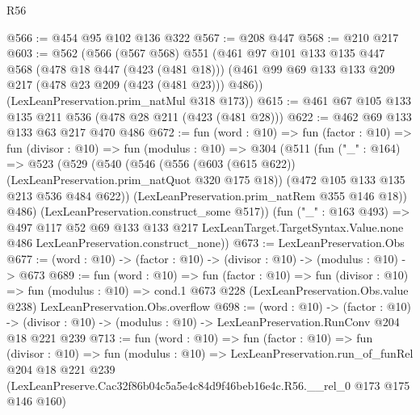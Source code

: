 \begin{lexlean}{R56}
\begin{coremodule}
@566 := @454 @95 @102 @136 @322
@567 := @208 @447
@568 := @210 @217
@603 := @562
    (@566
      (@567 @568)
      @551
      (@461
        @97
        @101
        @133
        @135
        @447
        @568
        (@478 @18 @447 (@423 (@481 @18)))
        (@461 @99 @69 @133 @133 @209 @217 (@478 @23 @209 (@423 (@481 @23))) @486))
      (LexLeanPreservation.prim_natMul @318 @173))
@615 := @461 @67 @105 @133 @135 @211 @536 (@478 @28 @211 (@423 (@481 @28)))
@622 := @462 @69 @133 @133 @63 @217 @470 @486
@672 := fun (word : @10) =>
  fun (factor : @10) =>
  fun (divisor : @10) =>
  fun (modulus : @10) =>
  @304
    (@511
      (fun ("_" : @164) =>
      @523
        (@529
          (@540
            (@546
              (@556 (@603 (@615 @622)) (LexLeanPreservation.prim_natQuot @320 @175 @18))
              (@472 @105 @133 @135 @213 @536 @484 @622))
            (LexLeanPreservation.prim_natRem @355 @146 @18))
          @486)
        (LexLeanPreservation.construct_some @517))
      (fun ("_" : @163 @493) =>
      @497
        @117
        @52
        @69
        @133
        @133
        @217
        LexLeanTarget.TargetSyntax.Value.none
        @486
        LexLeanPreservation.construct_none))
@673 := LexLeanPreservation.Obs
@677 := (word : @10) -> (factor : @10) -> (divisor : @10) -> (modulus : @10) -> @673
@689 := fun (word : @10) =>
  fun (factor : @10) =>
  fun (divisor : @10) =>
  fun (modulus : @10) =>
  cond.{1} @673 @228 (LexLeanPreservation.Obs.value @238) LexLeanPreservation.Obs.overflow
@698 := (word : @10) ->
  (factor : @10) ->
  (divisor : @10) -> (modulus : @10) -> LexLeanPreservation.RunConv @204 @18 @221 @239
@713 := fun (word : @10) =>
  fun (factor : @10) =>
  fun (divisor : @10) =>
  fun (modulus : @10) =>
  LexLeanPreservation.run_of_funRel
    @204
    @18
    @221
    @239
    (LexLeanPreserve.Cac32f86b04c5a5e4c84d9f46beb16e4c.R56.__rel_0 @173 @175 @146 @160)
\end{coremodule}
\end{lexlean}
